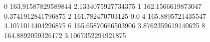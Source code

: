 0 163.91587829589844 2.1334075927734375
1 162.1566619873047 0.3741912841796875
2 161.782470703125 0.0
4 165.8895721435547 4.1071014404296875
6 165.65870666503906 3.8762359619140625
8 164.8892059326172 3.1067352294921875
